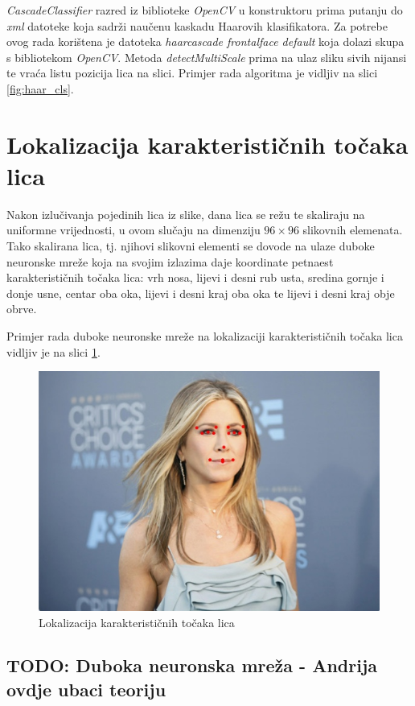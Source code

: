 \documentclass[times, utf8, zavrsni, numeric]{fer}
\begin{document}
\emph{CascadeClassifier} razred iz biblioteke \emph{OpenCV} u konstruktoru prima putanju do \emph{xml} datoteke koja sadrži naučenu kaskadu Haarovih klasifikatora. Za potrebe ovog rada korištena je datoteka \emph{haarcascade frontalface default} koja dolazi skupa s bibliotekom \emph{OpenCV}. Metoda \emph{detectMultiScale} prima na ulaz sliku sivih nijansi te vraća listu pozicija lica na slici. Primjer rada algoritma je vidljiv na slici \ref{fig:haar_cls}.

\section{Lokalizacija karakterističnih točaka lica}

Nakon izlučivanja pojedinih lica iz slike, dana lica se režu te skaliraju na uniformne vrijednosti, u ovom slučaju na dimenziju $96 \times 96$ slikovnih elemenata. Tako skalirana lica, tj. njihovi slikovni elementi se dovode na ulaze duboke neuronske mreže koja na svojim izlazima daje koordinate petnaest karakterističnih točaka lica: vrh nosa, lijevi i desni rub usta, sredina gornje i donje usne, centar oba oka, lijevi i desni kraj oba oka te lijevi i desni kraj obje obrve.

Primjer rada duboke neuronske mreže na lokalizaciji karakterističnih točaka lica vidljiv je na slici \ref{fig:lkt}.

\begin{figure}[htb]
    \centering
    \includegraphics[width=13cm]{images/jennifer_good.jpg}
    \caption{Lokalizacija karakterističnih točaka lica}
    \label{fig:lkt}
\end{figure}

\subsection{TODO: Duboka neuronska mreža - Andrija ovdje ubaci teoriju}
\end{document}
